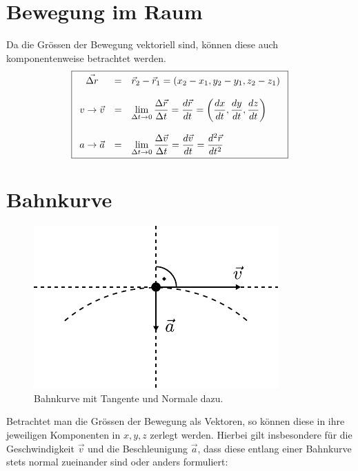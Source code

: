 \section{Bewegung im Raum}
Da die Grössen der Bewegung vektoriell sind, können diese auch 
komponentenweise betrachtet werden.
\[ \boxed{\begin{array}{c c l}
	\vec{\Delta r} 
		&=& \vec{r}_2-\vec{r}_1
		= (x_2-x_1,y_2-y_1,z_2-z_1) \\
	& \\
	v \rightarrow \vec{v} 
		&=& \displaystyle \lim\limits_{\Delta t \rightarrow 0}
			{\frac{\Delta \vec{r}}{\Delta t}}
		= \displaystyle \frac{d\vec{r}}{dt}
		= \displaystyle
		\left(\frac{dx}{dt},\frac{dy}{dt},\frac{dz}{dt}\right) \\
	& \\
	a \rightarrow \vec{a} 
		&=& \displaystyle \lim\limits_{\Delta t \rightarrow 0}
			{\frac{\Delta \vec{v}}{\Delta t}}
		= \displaystyle \frac{d\vec{v}}{dt}
		= \displaystyle \frac{d^2\vec{r}}{dt^2}
\end{array}}\]
		
\section{Bahnkurve}

\begin{figure}[h!]
	\centering
	\includegraphics[scale=0.8]{../fig/bahnkurve.pdf}
	\caption{Bahnkurve mit Tangente und Normale dazu.}
	\label{fig:bahnkurve}
\end{figure}

\noindent
Betrachtet man die Grössen der Bewegung als Vektoren, so können diese 
in ihre jeweiligen Komponenten in $x,y,z$ zerlegt werden. Hierbei gilt 
insbesondere für die Geschwindigkeit $\vec{v}$ und die Beschleunigung
$\vec{a}$, dass diese entlang einer Bahnkurve stets normal zueinander 
sind oder anders formuliert:

